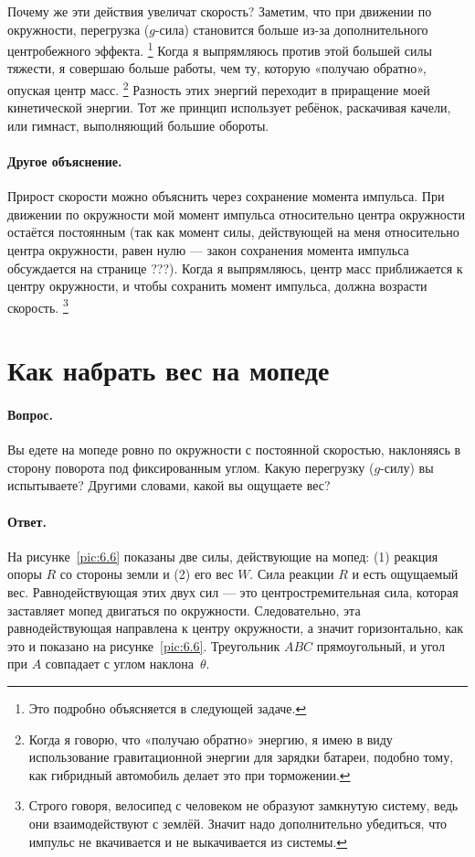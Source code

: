 Почему же эти действия увеличат скорость?
Заметим, что при движении по окружности, перегрузка ($g$-сила) становится больше из-за дополнительного центробежного эффекта.%
\footnote{Это подробно объясняется в следующей задаче.}
Когда я выпрямляюсь против этой большей силы тяжести, я совершаю больше работы, чем ту, которую «получаю обратно», опуская центр масс.%
\footnote{Когда я говорю, что «получаю обратно» энергию, я имею в виду использование гравитационной энергии для зарядки батареи, подобно тому, как гибридный автомобиль делает это при торможении.}
Разность этих энергий переходит в приращение моей кинетической энергии.
Тот же принцип использует ребёнок, раскачивая качели, или гимнаст, выполняющий большие обороты.

\paragraph{Другое объяснение.}
Прирост скорости можно объяснить через сохранение момента импульса.
При движении по окружности мой момент импульса относительно центра окружности остаётся постоянным (так как момент силы, действующей на меня относительно центра окружности, равен нулю --- закон сохранения момента импульса обсуждается на странице ???).
Когда я выпрямляюсь, центр масс приближается к центру окружности, и чтобы сохранить момент импульса, должна возрасти скорость.%
\footnote{Строго говоря, велосипед с человеком не образуют замкнутую систему, ведь они взаимодействуют с землёй. Значит надо дополнительно убедиться, что импульс не вкачивается и не выкачивается из системы.\pr}


\section{Как набрать вес на мопеде}

\paragraph{Вопрос.}
Вы едете на мопеде ровно по окружности с постоянной скоростью, наклоняясь в сторону поворота под фиксированным углом.
Какую перегрузку ($g$-силу) вы испытываете?
Другими словами, какой вы ощущаете вес?

\paragraph{Ответ.}
На рисунке~\ref{pic:6.6} показаны две силы, действующие на мопед:
(1) реакция опоры $R$ со стороны земли и (2) его вес $W$.
Сила реакции $R$ и есть ощущаемый вес.
Равнодействующая этих двух сил — это центростремительная сила, которая заставляет мопед двигаться по окружности.
Следовательно, эта равнодействующая направлена к центру окружности, а значит горизонтально, как это и показано на рисунке~\ref{pic:6.6}.
Треугольник $ABC$ прямоугольный, и угол при $A$ совпадает с углом наклона~$\theta$.

